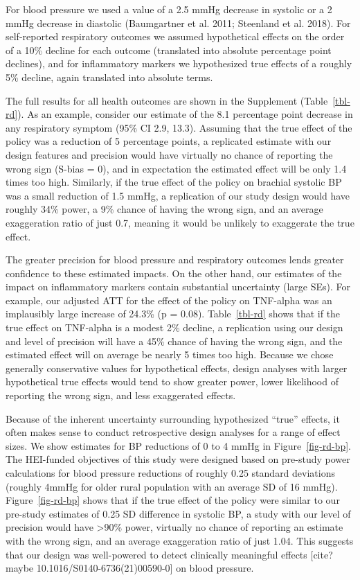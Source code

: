 \documentclass[
  letterpaper,
  DIV=11,
  numbers=noendperiod]{scrartcl}
\begin{document}
For blood pressure we used a value of a 2.5 mmHg decrease in systolic or
a 2 mmHg decrease in diastolic (Baumgartner et al. 2011; Steenland et
al. 2018). For self-reported respiratory outcomes we assumed
hypothetical effects on the order of a 10\% decline for each outcome
(translated into absolute percentage point declines), and for
inflammatory markers we hypothesized true effects of a roughly 5\%
decline, again translated into absolute terms.

The full results for all health outcomes are shown in the Supplement
(Table~\ref{tbl-rd}). As an example, consider our estimate of the 8.1
percentage point decrease in any respiratory symptom (95\% CI 2.9,
13.3). Assuming that the true effect of the policy was a reduction of 5
percentage points, a replicated estimate with our design features and
precision would have virtually no chance of reporting the wrong sign
(S-bias = 0), and in expectation the estimated effect will be only 1.4
times too high. Similarly, if the true effect of the policy on brachial
systolic BP was a small reduction of 1.5 mmHg, a replication of our
study design would have roughly 34\% power, a 9\% chance of having the
wrong sign, and an average exaggeration ratio of just 0.7, meaning it
would be unlikely to exaggerate the true effect.

The greater precision for blood pressure and respiratory outcomes lends
greater confidence to these estimated impacts. On the other hand, our
estimates of the impact on inflammatory markers contain substantial
uncertainty (large SEs). For example, our adjusted ATT for the effect of
the policy on TNF-alpha was an implausibly large increase of 24.3\% (p =
0.08). Table~\ref{tbl-rd} shows that if the true effect on TNF-alpha is
a modest 2\% decline, a replication using our design and level of
precision will have a 45\% chance of having the wrong sign, and the
estimated effect will on average be nearly 5 times too high. Because we
chose generally conservative values for hypothetical effects, design
analyses with larger hypothetical true effects would tend to show
greater power, lower likelihood of reporting the wrong sign, and less
exaggerated effects.

Because of the inherent uncertainty surrounding hypothesized ``true''
effects, it often makes sense to conduct retrospective design analyses
for a range of effect sizes. We show estimates for BP reductions of 0 to
4 mmHg in Figure~\ref{fig-rd-bp}. The HEI-funded objectives of this
study were designed based on pre-study power calculations for blood
pressure reductions of roughly 0.25 standard deviations (roughly 4mmHg
for older rural population with an average SD of 16 mmHg).
Figure~\ref{fig-rd-bp} shows that if the true effect of the policy were
similar to our pre-study estimates of 0.25 SD difference in systolic BP,
a study with our level of precision would have \textgreater90\% power,
virtually no chance of reporting an estimate with the wrong sign, and an
average exaggeration ratio of just 1.04. This suggests that our design
was well-powered to detect clinically meaningful effects {[}cite? maybe
10.1016/S0140-6736(21)00590-0{]} on blood pressure.
\end{document}
